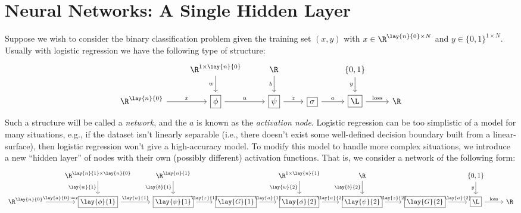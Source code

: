 


\section{Neural Networks: A Single Hidden Layer}
Suppose we wish to consider the binary classification problem given the training set $(x,y)$ with $x\in\R^{\lay{n}{0}\times N}$ and $y\in\{0,1\}^{1\times N}$.  Usually with logistic regression we have the following type of structure:
\begin{equation*}
	\begin{tikzcd}
		{}
		&\R^{1\times\lay{n}{0}}
		\arrow[d, swap, "w"]
		&\R^{}
		\arrow[d, swap, "b"]
		&{}
		&\{0,1\}
		\arrow[d, swap, "y"]
		&{}
		\\
		\R^{\lay{n}{0}}
		\arrow[r, "x"]
		&\boxed{\phi}
		\arrow[r, "u"]
		&\boxed{\psi}
		\arrow[r, "z"]
		&\boxed{\sigma}
		\arrow[r, "a"]
		&\boxed{\L}
		\arrow[r, "\text{loss}"]
		&\R
	\end{tikzcd}
\end{equation*}
Such a structure will be called a \textit{network}, and the $a$ is known as the \textit{activation node}.  Logistic regression can be too simplistic of a model for many situations, e.g., if the dataset isn't linearly separable (i.e., there doesn't exist some well-defined decision boundary built from a linear-surface), then logistic regression won't give a high-accuracy model.  To modify this model to handle more complex situations, we introduce a new ``hidden layer'' of nodes with their own (possibly different) activation functions.  That is, we consider a network of the following form:
{\tiny
\begin{equation*}
	\begin{tikzcd}
		{}
		&\R^{\lay{n}{1}\times\lay{n}{0}}
		\arrow[d, swap, "\lay{w}{1}"]
		&\R^{\lay{n}{1}}
		\arrow[d, swap, "\lay{b}{1}"]
		&{}
		&\R^{1\times\lay{n}{1}}
		\arrow[d, swap, "\lay{w}{2}"]
		&\R
		\arrow[d, swap, "\lay{b}{2}"]
		&{}
		&\{0,1\}
		\arrow[d, swap, "y"]
		&{}
		\\
		\R^{\lay{n}{0}}
		\arrow[r, "\lay{a}{0}:=x"]
		&\boxed{\lay{\phi}{1}}
		\arrow[r, "\lay{u}{1}"]
		&\boxed{\lay{\psi}{1}}
		\arrow[r, "\lay{z}{1}"]
		&\boxed{\lay{G}{1}}
		\arrow[r, "\lay{a}{1}"]
		&\boxed{\lay{\phi}{2}}
		\arrow[r, "\lay{u}{2}"]
		&\boxed{\lay{\psi}{2}}
		\arrow[r, "\lay{z}{2}"]
		&\boxed{\lay{G}{2}}
		\arrow[r, "\lay{a}{2}"]
		&\boxed{\L}
		\arrow[r, "\text{loss}"]
		&\R
	\end{tikzcd}
\end{equation*}
}

